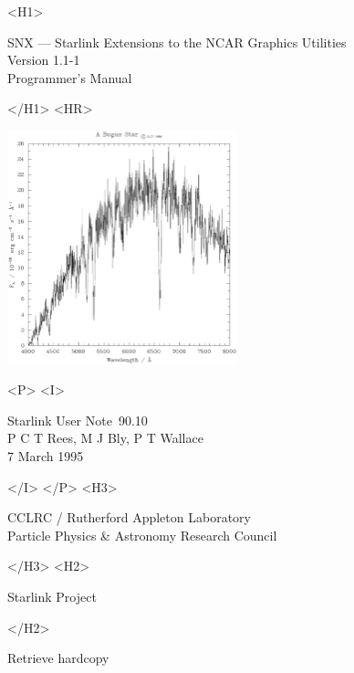 \documentclass[twoside,11pt]{article}
\newcommand{\stardoccategory}  {Starlink User Note}
\newcommand{\stardocsource}    {sun\stardocnumber}
\newcommand{\stardocnumber}    {90.10}
\newcommand{\stardocauthors}   {P C T Rees, M J Bly,  P T Wallace}
\newcommand{\stardocdate}      {7 March 1995}
\newcommand{\stardoctitle}     {SNX --- Starlink Extensions to
                                the NCAR Graphics Utilities}
\newcommand{\stardocversion}   {Version 1.1-1}
\newcommand{\stardocmanual}    {Programmer's Manual}
\newcommand{\htmladdnormallink}[2]{#1}
\newcommand{\htmladdimg}[1]{}
\newcommand{\xlabel}[1]{}
\renewcommand{\_}{\texttt{\symbol{95}}}
\begin{document}
\begin{htmlonly}
   \xlabel{}
   \begin{rawhtml} <H1> \end{rawhtml}
      \stardoctitle\\
      \stardocversion\\
      \stardocmanual
   \begin{rawhtml} </H1> <HR> \end{rawhtml}

    \includegraphics[width=0.5\textwidth]{sun90-fig-1.eps}

   \begin{rawhtml} <P> <I> \end{rawhtml}
   \stardoccategory\ \stardocnumber \\
   \stardocauthors \\
   \stardocdate
   \begin{rawhtml} </I> </P> <H3> \end{rawhtml}
      \htmladdnormallink{CCLRC / Rutherford Appleton Laboratory}
                        {http://www.cclrc.ac.uk} \\
      \htmladdnormallink{Particle Physics \& Astronomy Research Council}
                        {http://www.pparc.ac.uk} \\
   \begin{rawhtml} </H3> <H2> \end{rawhtml}
      \htmladdnormallink{Starlink Project}{http://www.starlink.ac.uk/}
   \begin{rawhtml} </H2> \end{rawhtml}
   \htmladdnormallink{\htmladdimg{source.gif} Retrieve hardcopy}
      {http://www.starlink.ac.uk/cgi-bin/hcserver?\stardocsource}\\


\end{htmlonly}
\end{document}
